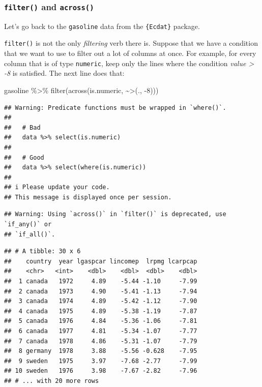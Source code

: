 \documentclass[
]{article}
\newenvironment{Shaded}{\begin{snugshade}}{\end{snugshade}}
\newcommand{\AttributeTok}[1]{\textcolor[rgb]{0.77,0.63,0.00}{#1}}
\newcommand{\DecValTok}[1]{\textcolor[rgb]{0.00,0.00,0.81}{#1}}
\newcommand{\FunctionTok}[1]{\textcolor[rgb]{0.00,0.00,0.00}{#1}}
\newcommand{\NormalTok}[1]{#1}
\newcommand{\SpecialCharTok}[1]{\textcolor[rgb]{0.00,0.00,0.00}{#1}}
\newcommand{\StringTok}[1]{\textcolor[rgb]{0.31,0.60,0.02}{#1}}
\begin{document}
\hypertarget{filter-and-across}{%
\subsubsection{\texorpdfstring{\texttt{filter()} and \texttt{across()}}{filter() and across()}}\label{filter-and-across}}

Let's go back to the \texttt{gasoline} data from the \texttt{\{Ecdat\}} package.

\texttt{filter()} is not the only \emph{filtering} verb there is. Suppose that we have a condition that we want
to use to filter out a lot of columns at once. For example, for every column that is of type
\texttt{numeric}, keep only the lines where the condition \emph{value \textgreater{} -8} is satisfied. The next line does
that:

\begin{Shaded}
\begin{Highlighting}[]
\NormalTok{gasoline }\SpecialCharTok{\%\textgreater{}\%}
  \FunctionTok{filter}\NormalTok{(}\FunctionTok{across}\NormalTok{(is.numeric, }\SpecialCharTok{\textasciitilde{}}\StringTok{\textasciigrave{}}\AttributeTok{\textgreater{}}\StringTok{\textasciigrave{}}\NormalTok{(., }\SpecialCharTok{{-}}\DecValTok{8}\NormalTok{)))}
\end{Highlighting}
\end{Shaded}

\begin{verbatim}
## Warning: Predicate functions must be wrapped in `where()`.
## 
##   # Bad
##   data %>% select(is.numeric)
## 
##   # Good
##   data %>% select(where(is.numeric))
## 
## i Please update your code.
## This message is displayed once per session.
\end{verbatim}

\begin{verbatim}
## Warning: Using `across()` in `filter()` is deprecated, use `if_any()` or
## `if_all()`.
\end{verbatim}

\begin{verbatim}
## # A tibble: 30 x 6
##    country  year lgaspcar lincomep  lrpmg lcarpcap
##    <chr>   <int>    <dbl>    <dbl>  <dbl>    <dbl>
##  1 canada   1972     4.89    -5.44 -1.10     -7.99
##  2 canada   1973     4.90    -5.41 -1.13     -7.94
##  3 canada   1974     4.89    -5.42 -1.12     -7.90
##  4 canada   1975     4.89    -5.38 -1.19     -7.87
##  5 canada   1976     4.84    -5.36 -1.06     -7.81
##  6 canada   1977     4.81    -5.34 -1.07     -7.77
##  7 canada   1978     4.86    -5.31 -1.07     -7.79
##  8 germany  1978     3.88    -5.56 -0.628    -7.95
##  9 sweden   1975     3.97    -7.68 -2.77     -7.99
## 10 sweden   1976     3.98    -7.67 -2.82     -7.96
## # ... with 20 more rows
\end{verbatim}
\end{document}

